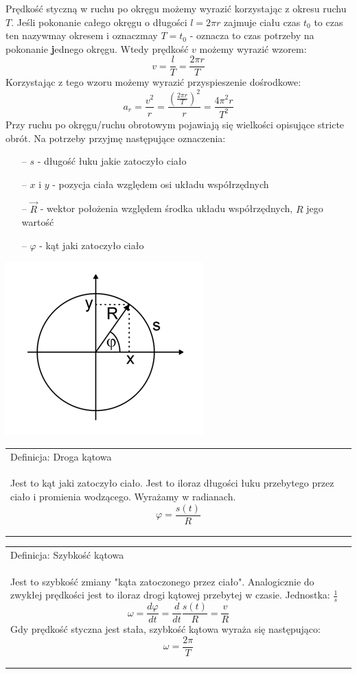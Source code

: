 \documentclass[a4paper]{article}
\newenvironment{definition}[2][Definicja]
    {
        \begin{center}
        \begin{tabular}{|p{1\textwidth}|}
        \hline
            #1: #2\\[2ex]
        \begin{em}
        \Large
    }
    { 
        \end{em}
        \\\hline
        \end{tabular} 
        \end{center}
    }
\begin{document}
    Prędkość styczną w ruchu po okręgu możemy wyrazić korzystając z okresu ruchu $T$.
    Jeśli pokonanie całego okręgu o długości $l = 2\pi r$ zajmuje ciału czas $t_0$ to czas
    ten nazywmay okresem i oznaczmay $T = t_0$ - oznacza to czas potrzeby na pokonanie \textbf 
    jednego okręgu.
    Wtedy prędkość $v$ możemy wyrazić wzorem:
    \[v = \frac{l}{T} = \frac{2\pi r}{T} \]
    Korzystając z tego wzoru możemy wyrazić przyspieszenie dośrodkowe:
    \[a_r = \frac{v^2}{r} = \frac{\left (\frac{2\pi r}{T} \right )^2}{r} = \frac{4\pi^2 r}{T^2}\]
    Przy ruchu po okręgu/ruchu obrotowym pojawiają się wielkości opisujące stricte obrót. 
    Na potrzeby przyjmę następujące oznaczenia:
    \begin{itemize}
        \item [--] $s$ - długość łuku jakie zatoczyło ciało
        \item [--] $x$ i $y$ - pozycja ciała względem osi układu współrzędnych
        \item [--] $\vec{R}$ - wektor położenia względem środka układu współrzędnych, $R$ jego wartość
        \item [--] $\varphi$ - kąt jaki zatoczyło ciało
    \end{itemize}
    \begin{center}
        \includegraphics{img/ruchokrag2.png}
    \end{center}
    \begin{definition}{Droga kątowa}
        Jest to kąt jaki zatoczyło ciało. Jest to iloraz długości łuku przebytego przez ciało i 
        promienia wodzącego. Wyrażamy w radianach.
        \[\varphi = \frac{s(t)}{R}\]
    \end{definition}
    \begin{definition}{Szybkość kątowa}
        Jest to szybkość zmiany "kąta zatoczonego przez ciało". Analogicznie do zwykłej prędkości jest to 
        iloraz drogi kątowej przebytej w czasie. Jednostka: $\frac{1}{s}$
        \[\omega = \frac{d\varphi}{dt} = \frac{d}{dt} \frac{s(t)}{R} = \frac{v}{R}\]
        Gdy prędkość styczna jest stała, szybkość kątowa wyraża się następująco:
        \[\omega = \frac{2\pi}{T}\]

    \end{definition}
\end{document}
